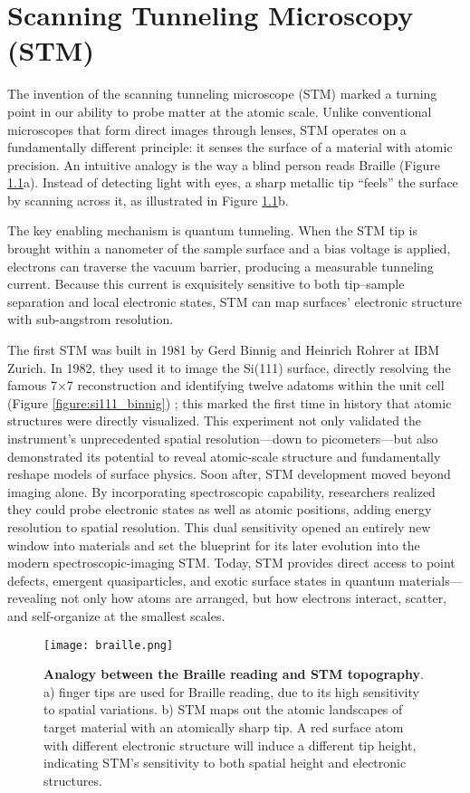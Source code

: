 \chapter{Scanning Tunneling Microscopy (STM)}
The invention of the scanning tunneling microscope (STM) marked a turning point in our ability to probe matter at the atomic scale. Unlike conventional microscopes that form direct images through lenses, STM operates on a fundamentally different principle: it senses the surface of a material with atomic precision. An intuitive analogy is the way a blind person reads Braille (Figure \ref{fig:braille}a). Instead of detecting light with eyes, a sharp metallic tip “feels” the surface by scanning across it, as illustrated in Figure \ref{fig:braille}b.

The key enabling mechanism is quantum tunneling. When the STM tip is brought within a nanometer of the sample surface and a bias voltage is applied, electrons can traverse the vacuum barrier, producing a measurable tunneling current. Because this current is exquisitely sensitive to both tip–sample separation and local electronic states, STM can map surfaces' electronic structure with sub-angstrom resolution.

The first STM was built in 1981 by Gerd Binnig and Heinrich Rohrer at IBM Zurich. In 1982, they used it to image the Si(111) surface, directly resolving the famous 7×7 reconstruction and identifying twelve adatoms within the unit cell (Figure \ref{figure:si111_binnig}) \cite{binnig77Reconstruction1983}; this marked the first time in history that atomic structures were directly visualized. This experiment not only validated the instrument’s unprecedented spatial resolution—down to picometers—but also demonstrated its potential to reveal atomic-scale structure and fundamentally reshape models of surface physics. Soon after, STM development moved beyond imaging alone. By incorporating spectroscopic capability, researchers realized they could probe electronic states as well as atomic positions, adding energy resolution to spatial resolution. This dual sensitivity opened an entirely new window into materials and set the blueprint for its later evolution into the modern spectroscopic-imaging STM. Today, STM provides direct access to point defects, emergent quasiparticles, and exotic surface states in quantum materials—revealing not only how atoms are arranged, but how electrons interact, scatter, and self-organize at the smallest scales.

\begin{figure}
	\centering
	\texttt{[image: braille.png]}
	\caption[\textbf{Analogy between the Braille reading and STM topography}]{\textbf{Analogy between the Braille reading and STM topography}. a) finger tips are used for Braille reading, due to its high sensitivity to spatial variations. b) \ac{STM} maps out the atomic landscapes of target material with an atomically sharp tip. A red surface atom with different electronic structure will induce a different tip height, indicating \ac{STM}'s sensitivity to both spatial height and electronic structures.}
	\label{fig:braille}
\end{figure}

